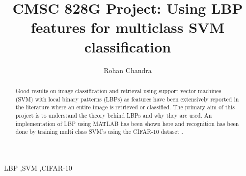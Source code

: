 \documentclass[preprint,12pt]{elsarticle}
\begin{document}
\begin{frontmatter}


\title{CMSC 828G Project: Using LBP features for multiclass SVM classification}



\author{Rohan Chandra}

\address{(In continuation to project 1))}

\begin{abstract}
Good results on image classification and retrieval using support vector machines (SVM) \cite{burges1998tutorial} with local binary patterns (LBPs) as features have been extensively reported in the literature \cite{ojala2002multiresolution} where an entire image is retrieved or classified. The primary aim of this project is to understand the theory behind LBPs and why they are used. An implementation of LBP using MATLAB has been shown here and recognition has been done by training multi class SVM's using the CIFAR-10 dataset \cite{krizhevsky2009learning}.
\end{abstract}

\begin{keyword}
LBP \sep SVM \sep CIFAR-10


\end{keyword}

\end{frontmatter}
\end{document}
